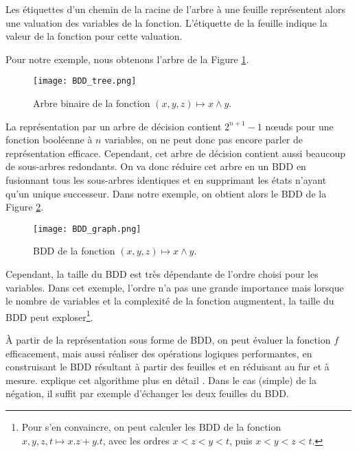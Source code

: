 Les étiquettes d'un chemin de la racine de l'arbre à une feuille représentent
alors une valuation des variables de la fonction. L'étiquette de la feuille
indique la valeur de la fonction pour cette valuation.

Pour notre exemple, nous obtenons l'arbre de la Figure \ref{fig:BDD_tree}.

\begin{figure}[ht!]
\begin{center}
  \texttt{[image: BDD\_tree.png]}
\end{center}
\caption{Arbre binaire de la fonction \((x,y,z) \mapsto x \land y\).}
\label{fig:BDD_tree}
\end{figure}

La représentation par un arbre de décision contient \(2^{n+1} - 1\) nœuds pour
une fonction booléenne à \(n\) variables, on ne peut donc pas encore parler de
représentation efficace. Cependant, cet arbre de décision contient aussi
beaucoup de sous-arbres redondants. On va donc réduire cet arbre en un BDD en
fusionnant tous les sous-arbres identiques et en supprimant les états n'ayant
qu'un unique successeur. Dans notre exemple, on obtient alors le BDD de la
Figure \ref{fig:BDD_graph}.

\begin{figure}[h]
\begin{center}
\texttt{[image: BDD\_graph.png]}
\end{center}
\caption{BDD de la fonction \((x,y,z) \mapsto x \land y\).}
\label{fig:BDD_graph}
\end{figure}

Cependant, la taille du BDD est très dépendante de l'ordre choisi pour
les variables\cite{OBDD}. Dans cet exemple, l'ordre n'a pas une grande importance
mais lorsque le nombre de variables et la complexité de la fonction
augmentent, la taille du BDD peut exploser\footnote{Pour s'en
  convaincre, on peut calculer les BDD de la fonction
  \(x, y, z, t \mapsto x.z + y.t\), avec les ordres \(x<z<y<t\), puis
  \(x<y<z<t\).}.

À partir de la représentation sous forme de BDD, on peut évaluer la
fonction \(f\) efficacement, mais aussi réaliser des opérations logiques
performantes, en construisant le BDD résultant à partir des
feuilles et en réduisant au fur et à mesure. \cite{OBDD} explique cet
algorithme plus en détail . Dans le cas (simple) de la
négation, il suffit par exemple d'échanger les deux feuilles du BDD.

